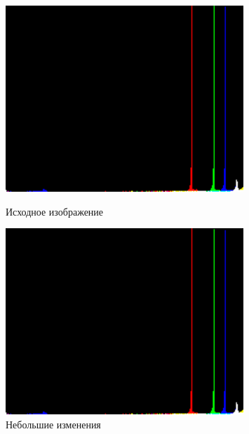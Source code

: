 \documentclass[a4paper]{article}
\begin{document}
  \begin{figure}[H]
    \centering
    \begin{minipage}[t]{0.4\textwidth}
        \centering
        \includegraphics[width=0.8\textwidth]{hist}
        \caption{Исходное изображение}
    \end{minipage}
    \hfill
    \begin{minipage}[t]{0.4\textwidth}
        \centering
        \includegraphics[width=0.8\textwidth]{hist_1}
        \caption{Небольшие изменения} 
    \end{minipage}
  \end{figure}
\end{document}

